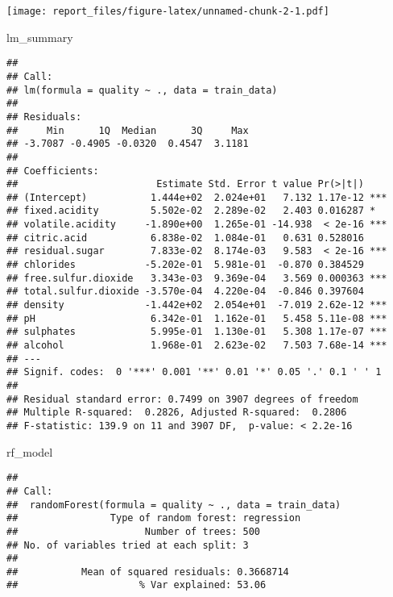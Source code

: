 \documentclass[
]{article}
\newenvironment{Shaded}{\begin{snugshade}}{\end{snugshade}}
\newcommand{\NormalTok}[1]{#1}
\begin{document}
\texttt{[image: report\_files/figure-latex/unnamed-chunk-2-1.pdf]}

\begin{Shaded}
\begin{Highlighting}[]
\NormalTok{lm\_summary}
\end{Highlighting}
\end{Shaded}

\begin{verbatim}
## 
## Call:
## lm(formula = quality ~ ., data = train_data)
## 
## Residuals:
##     Min      1Q  Median      3Q     Max 
## -3.7087 -0.4905 -0.0320  0.4547  3.1181 
## 
## Coefficients:
##                        Estimate Std. Error t value Pr(>|t|)    
## (Intercept)           1.444e+02  2.024e+01   7.132 1.17e-12 ***
## fixed.acidity         5.502e-02  2.289e-02   2.403 0.016287 *  
## volatile.acidity     -1.890e+00  1.265e-01 -14.938  < 2e-16 ***
## citric.acid           6.838e-02  1.084e-01   0.631 0.528016    
## residual.sugar        7.833e-02  8.174e-03   9.583  < 2e-16 ***
## chlorides            -5.202e-01  5.981e-01  -0.870 0.384529    
## free.sulfur.dioxide   3.343e-03  9.369e-04   3.569 0.000363 ***
## total.sulfur.dioxide -3.570e-04  4.220e-04  -0.846 0.397604    
## density              -1.442e+02  2.054e+01  -7.019 2.62e-12 ***
## pH                    6.342e-01  1.162e-01   5.458 5.11e-08 ***
## sulphates             5.995e-01  1.130e-01   5.308 1.17e-07 ***
## alcohol               1.968e-01  2.623e-02   7.503 7.68e-14 ***
## ---
## Signif. codes:  0 '***' 0.001 '**' 0.01 '*' 0.05 '.' 0.1 ' ' 1
## 
## Residual standard error: 0.7499 on 3907 degrees of freedom
## Multiple R-squared:  0.2826, Adjusted R-squared:  0.2806 
## F-statistic: 139.9 on 11 and 3907 DF,  p-value: < 2.2e-16
\end{verbatim}

\begin{Shaded}
\begin{Highlighting}[]
\NormalTok{rf\_model}
\end{Highlighting}
\end{Shaded}

\begin{verbatim}
## 
## Call:
##  randomForest(formula = quality ~ ., data = train_data) 
##                Type of random forest: regression
##                      Number of trees: 500
## No. of variables tried at each split: 3
## 
##           Mean of squared residuals: 0.3668714
##                     % Var explained: 53.06
\end{verbatim}
\end{document}
